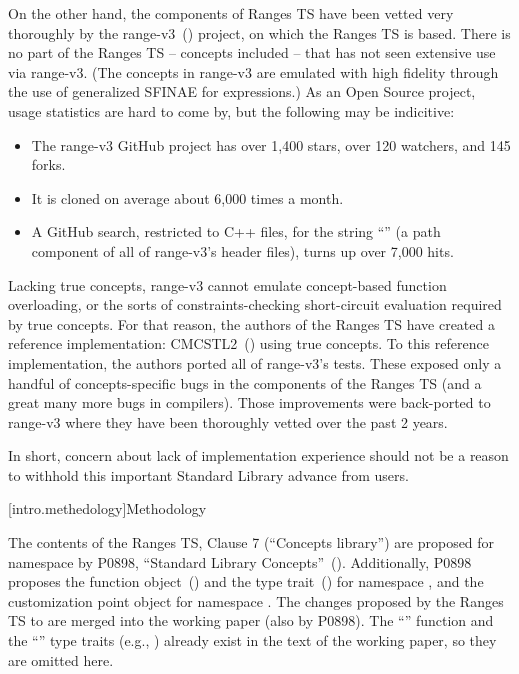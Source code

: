 \pnum
On the other hand, the components of Ranges TS have been vetted very thoroughly
by the range-v3~(\cite{range-v3}) project, on which the Ranges TS is based. There is
no part of the Ranges TS -- concepts included -- that has not seen extensive use
via range-v3. (The concepts in range-v3 are emulated with high fidelity through
the use of generalized SFINAE for expressions.) As an Open Source project, usage
statistics are hard to come by, but the following may be indicitive:

\begin{itemize}
\item The range-v3 GitHub project has over 1,400 stars, over 120 watchers, and
145 forks.
\item It is cloned on average about 6,000 times a month.
\item A GitHub search, restricted to C++ files, for the string
``'' (a path component of all of range-v3's header files), turns
up over 7,000 hits.
\end{itemize}

\pnum
Lacking true concepts, range-v3 cannot emulate concept-based function
overloading, or the sorts of constraints-checking short-circuit evaluation
required by true concepts. For that reason, the authors of the Ranges TS have
created a reference implementation: CMCSTL2~(\cite{cmcstl2}) using true concepts. To
this reference implementation, the authors ported all of range-v3's tests. These
exposed only a handful of concepts-specific bugs in the components of the Ranges
TS (and a great many more bugs in compilers). Those improvements were back-ported
to range-v3 where they have been thoroughly vetted over the past 2 years.

\pnum
In short, concern about lack of implementation experience should not be a reason
to withhold this important Standard Library advance from users.

[intro.methedology]{Methodology}

\pnum
The contents of the Ranges TS, Clause 7 (``Concepts library'') are proposed
for namespace  by P0898, ``Standard Library Concepts''~(\cite{P0898}).
Additionally, P0898 proposes the  function
object~() and the  type
trait~() for namespace , and the 
customization point object for namespace . The changes proposed by
the Ranges TS to  are merged into the working paper (also
by P0898). The ``'' function and the ``'' type
traits (e.g., ) already exist in the text of the
working paper, so they are omitted here.

